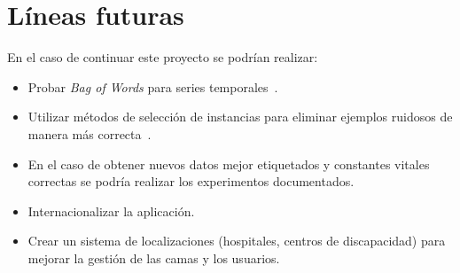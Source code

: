 \section{Líneas futuras}
En el caso de continuar este proyecto se podrían realizar:
\begin{itemize}
	\item Probar \textit{Bag of Words} para series temporales~\cite{johann_faouzi_2018_1244152}.
	\item Utilizar métodos de selección de instancias para eliminar ejemplos ruidosos de manera más correcta~\cite{arnaiz2016instance}.
	\item En el caso de obtener nuevos datos mejor etiquetados y constantes vitales correctas se podría realizar los experimentos documentados.
	\item Internacionalizar la aplicación.
	\item Crear un sistema de localizaciones (hospitales, centros de discapacidad) para mejorar la gestión de las camas y los usuarios.
\end{itemize}